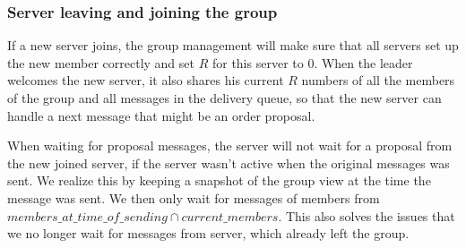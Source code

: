 \documentclass[runningheads]{llncs}
\begin{document}
\subsubsection{Server leaving and joining the group} \label{multicastchanges}

If a new server joins, the group management will make sure that all servers set
up the new member correctly and set $R$ for this server to 0. When the leader
welcomes the new server, it also shares his current $R$ numbers of all the
members of the group and all messages in the delivery queue, so that the new
server can handle a next message that might be an order proposal.

When waiting for proposal messages, the server will not wait for a proposal
from the new joined server, if the server wasn't active when the original
messages was sent. We realize this by keeping a snapshot of the group view at
the time the message was sent. We then only wait for messages of members from
$members\_at\_time\_of\_sending \cap current\_members$. This also solves the issues
that we no longer wait for messages from server, which already left the group.
\end{document}
